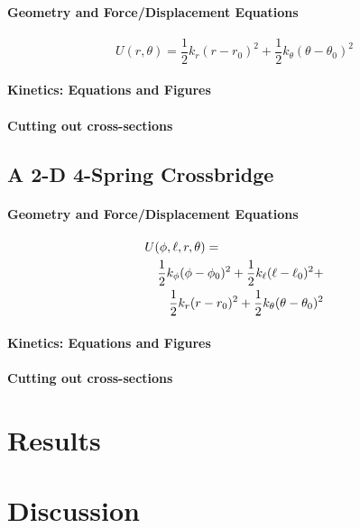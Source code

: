\documentclass[
	11pt]{article}
\begin{document}
\begin{multicols}{2}
\paragraph*{Geometry and Force/Displacement Equations}

\begin{equation}
U(r,\theta)=\frac{1}{2}k_r (r-r_0)^2+\frac{1}{2}k_\theta (\theta-\theta_0)^2
\end{equation}

\paragraph*{Kinetics: Equations and Figures}

\paragraph*{Cutting out cross-sections}

\subsection*{A 2-D 4-Spring Crossbridge}
\paragraph*{Geometry and Force/Displacement Equations}
\begin{eqnarray}
	\lefteqn{U(\phi,\ell,r,\theta) = }  \nonumber \\
 	& & \frac{1}{2}k_\phi (\phi-\phi_0)^2 + \frac{1}{2}k_\ell (\ell-\ell_0)^2 + \nonumber \\
	& & \frac{1}{2}k_r (r-r_0)^2 + \frac{1}{2}k_\theta (\theta-\theta_0)^2
\end{eqnarray}

\paragraph*{Kinetics: Equations and Figures}
\paragraph*{Cutting out cross-sections}


\section*{Results}


\section*{Discussion}


\end{multicols}
\end{document}
